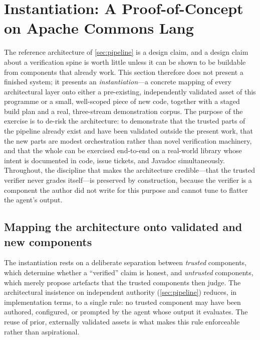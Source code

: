 \section{Instantiation: A Proof-of-Concept on Apache Commons Lang}
\label{sec:instantiation}\label{sec:poc}

The reference architecture of \cref{sec:pipeline} is a design claim, and a design claim about a verification spine is worth little unless it can be shown to be buildable from components that already work. This section therefore does not present a finished system; it presents an \emph{instantiation}---a concrete mapping of every architectural layer onto either a pre-existing, independently validated asset of this programme or a small, well-scoped piece of new code, together with a staged build plan and a real, three-stream demonstration corpus. The purpose of the exercise is to de-risk the architecture: to demonstrate that the trusted parts of the pipeline already exist and have been validated outside the present work, that the new parts are modest orchestration rather than novel verification machinery, and that the whole can be exercised end-to-end on a real-world library whose intent is documented in code, issue tickets, and Javadoc simultaneously. Throughout, the discipline that makes the architecture credible---that the trusted verifier never grades itself---is preserved by construction, because the verifier is a component the author did not write for this purpose and cannot tune to flatter the agent's output.

\subsection{Mapping the architecture onto validated and new components}
\label{subsec:inst-mapping}

The instantiation rests on a deliberate separation between \emph{trusted} components, which determine whether a ``verified'' claim is honest, and \emph{untrusted} components, which merely propose artefacts that the trusted components then judge. The architectural insistence on independent authority (\cref{sec:pipeline}) reduces, in implementation terms, to a single rule: no trusted component may have been authored, configured, or prompted by the agent whose output it evaluates. The reuse of prior, externally validated assets is what makes this rule enforceable rather than aspirational.

